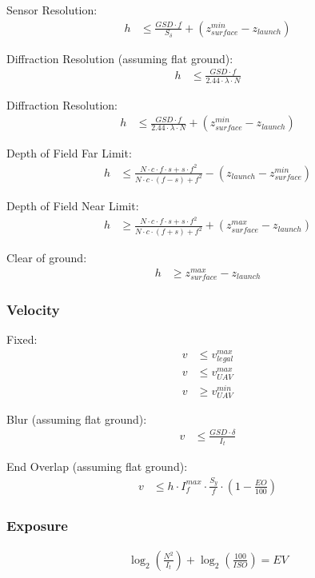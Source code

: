 \documentclass[11pt]{article}
\begin{document}
Sensor Resolution:
\begin{align}
    h &\leq \frac{GSD \cdot f}{S_\delta} + (z_{surface}^{min} - z_{launch}) \label{eq:ConHeightPixResRough}
\end{align}

Diffraction Resolution (assuming flat ground):
\begin{align}
    h &\leq \frac{GSD \cdot f}{2.44 \cdot \lambda \cdot N} \label{eq:ConHeightDiff}
\end{align}

Diffraction Resolution:
\begin{align}
    h &\leq \frac{GSD \cdot f}{2.44 \cdot \lambda \cdot N} + (z_{surface}^{min} - z_{launch}) \label{eq:ConHeightDiffRough}
\end{align}

Depth of Field Far Limit:
\begin{align}
    h &\leq \frac{N \cdot c \cdot f \cdot s + s \cdot f^2}{N \cdot c \cdot (f-s) + f^2} - (z_{launch} - z_{surface}^{min}) \label{eq:ConHeightDF}
\end{align}

Depth of Field Near Limit:
\begin{align}
    h &\geq \frac{N \cdot c \cdot f \cdot s + s \cdot f^2}{N \cdot c \cdot (f+s) + f^2} + (z_{surface}^{max} - z_{launch}) \label{eq:ConHeightDN}
\end{align}

Clear of ground:
\begin{align}
h &\geq z_{surface}^{max} - z_{launch}\label{eq:ConHeightSurface}
\end{align}

\subsubsection{Velocity}
Fixed:
\begin{align}
    v &\leq v_{legal}^{max} \label{eq:ConVelocityLegal} \\
    v &\leq v_{UAV}^{max} \label{eq:ConvelocityUAVmax} \\
    v &\geq v_{UAV}^{min} \label{eq:ConvelocityUAVmin}
\end{align}

Blur (assuming flat ground):
\begin{align}
    v &\leq \frac{GSD \cdot \delta}{I_t} \label{eq:ConVelocityBlur}
\end{align}

End Overlap (assuming flat ground):
\begin{align}
    v &\leq h \cdot I_f^{max} \cdot \frac{S_y}{f} \cdot (1 - \frac{EO}{100}) \label{eq:ConVelocityEndLap}
\end{align}

\subsubsection{Exposure}
\begin{align}
    \log_2(\frac{N^2}{I_t}) + \log_2(\frac{100}{ISO}) = EV \label{eq:ConExposure}
\end{align}



\end{document}
